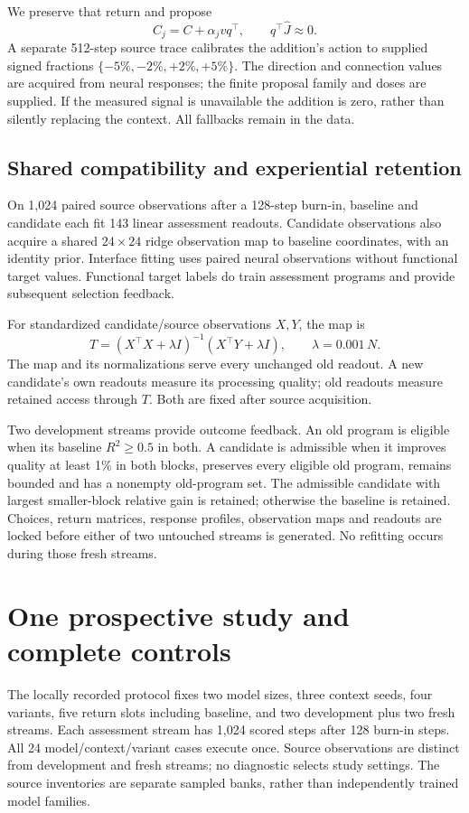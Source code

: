 \documentclass[11pt]{article}
\begin{document}
We preserve that return and propose
\begin{equation}
 C_j=C+\alpha_jvq^\top,\qquad q^\top\widehat J\approx0.
\end{equation}
A separate 512-step source trace calibrates the addition's action to supplied signed fractions $\{-5\%,-2\%,+2\%,+5\%\}$. The direction and connection values are acquired from neural responses; the finite proposal family and doses are supplied. If the measured signal is unavailable the addition is zero, rather than silently replacing the context. All fallbacks remain in the data.

\subsection{Shared compatibility and experiential retention}
On 1,024 paired source observations after a 128-step burn-in, baseline and candidate each fit 143 linear assessment readouts. Candidate observations also acquire a shared $24\times24$ ridge observation map to baseline coordinates, with an identity prior. Interface fitting uses paired neural observations without functional target values. Functional target labels do train assessment programs and provide subsequent selection feedback.

For standardized candidate/source observations $X,Y$, the map is
\begin{equation}
 T=(X^\top X+\lambda I)^{-1}(X^\top Y+\lambda I),\qquad \lambda=0.001\,N.
\end{equation}
The map and its normalizations serve every unchanged old readout. A new candidate's own readouts measure its processing quality; old readouts measure retained access through $T$. Both are fixed after source acquisition.

Two development streams provide outcome feedback. An old program is eligible when its baseline $R^2\geq0.5$ in both. A candidate is admissible when it improves quality at least 1\% in both blocks, preserves every eligible old program, remains bounded and has a nonempty old-program set. The admissible candidate with largest smaller-block relative gain is retained; otherwise the baseline is retained. Choices, return matrices, response profiles, observation maps and readouts are locked before either of two untouched streams is generated. No refitting occurs during those fresh streams.

\section{One prospective study and complete controls}
The locally recorded protocol fixes two model sizes, three context seeds, four variants, five return slots including baseline, and two development plus two fresh streams. Each assessment stream has 1,024 scored steps after 128 burn-in steps. All 24 model/context/variant cases execute once. Source observations are distinct from development and fresh streams; no diagnostic selects study settings. The source inventories are separate sampled banks, rather than independently trained model families.
\end{document}
